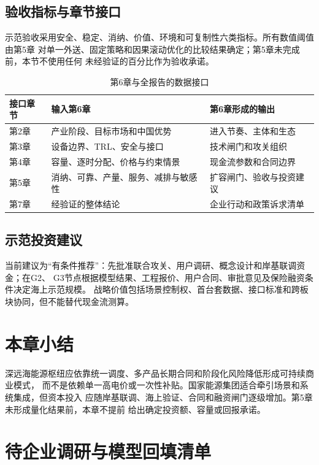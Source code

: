 \subsection{验收指标与章节接口}

示范验收采用安全、稳定、消纳、价值、环境和可复制性六类指标。所有数值阈值由第5章
对单一外送、固定策略和因果滚动优化的比较结果确定；第5章未完成前，本节不使用任何
未经验证的百分比作为验收承诺。

\begin{table}[H]
\centering
\caption{第6章与全报告的数据接口}
\label{tab:c6-chapter-interface}
\begin{tabularx}{\textwidth}{p{2.8cm} X X}
\toprule
接口章节 & 输入第6章 & 第6章形成的输出\\
\midrule
第2章 & 产业阶段、目标市场和中国优势 & 进入节奏、主体和生态\\
第3章 & 设备边界、TRL、安全与接口 & 技术闸门和攻关组织\\
第4章 & 容量、逐时分配、价格与约束情景 & 现金流参数和合同边界\\
第5章 & 消纳、可靠、产量、服务、减排与敏感性 & 扩容闸门、验收与投资建议\\
第7章 & 经验证的整体结论 & 企业行动和政策诉求清单\\
\bottomrule
\end{tabularx}
\end{table}

\subsection{示范投资建议}

当前建议为“有条件推荐”：先批准联合攻关、用户调研、概念设计和岸基联调资金；在G2、
G3节点根据模型结果、工程报价、用户合同、审批意见及保险融资条件决定海上示范规模。
战略价值包括场景控制权、首台套数据、接口标准和跨板块协同，但不能替代现金流测算。

\section*{本章小结}

深远海能源枢纽应依靠统一调度、多产品长期合同和阶段化风险降低形成可持续商业模式，
而不是依赖单一高电价或一次性补贴。国家能源集团适合牵引场景和系统集成，但资本投入
应随岸基联调、海上验证、合同和融资闸门逐级增加。第5章未形成量化结果前，本章不提前
给出确定投资额、容量或回报承诺。

\section*{待企业调研与模型回填清单}

